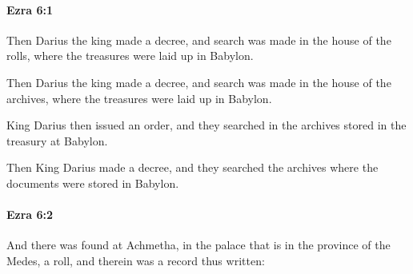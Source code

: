 		\paragraph{Ezra 6:1} %
			\label{EZRA-6-1}

			Then Darius the king made a decree, and search was made in the house of the rolls, where the treasures were laid up in Babylon.

			\begin{versebox}
					\item[BHS] 
					\item[LXX] 
					\item[ASV] Then Darius the king made a decree, and search was made in the house of the archives, where the treasures were laid up in Babylon.
					\item[NIV] King Darius then issued an order, and they searched in the archives stored in the treasury at Babylon.
					\item[NRSV] Then King Darius made a decree, and they searched the archives where the documents were stored in Babylon.
			\end{versebox}

		\paragraph{Ezra 6:2} %
			\label{EZRA-6-2}

			And there was found at Achmetha, in the palace that is in the province of the Medes, a roll, and therein was a record thus written:

